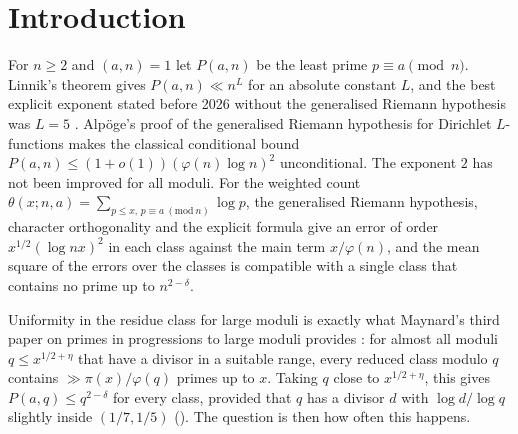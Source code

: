 \documentclass[11pt,colorlinks]{charlie}
\begin{document}
\section{Introduction}
For $n\ge2$ and $(a,n)=1$ let $P(a,n)$ be the least prime $p\equiv a\pmod n$. Linnik's theorem gives $P(a,n)\ll n^L$ for an absolute constant $L$, and the best explicit exponent stated before 2026 without the generalised Riemann hypothesis was $L=5$ \cite[Thm.~2.1]{Xylouris}. Alp\"oge's proof of the generalised Riemann hypothesis for Dirichlet $L$-functions \cite{Alpoge} makes the classical conditional bound $P(a,n)\le(1+o(1))(\varphi(n)\log n)^2$ \cite{BS} unconditional. The exponent $2$ has not been improved for all moduli. For the weighted count $\theta(x;n,a)=\sum_{p\le x,\,p\equiv a\ (\mathrm{mod}\ n)}\log p$, the generalised Riemann hypothesis, character orthogonality and the explicit formula give an error of order $x^{1/2}(\log nx)^2$ in each class against the main term $x/\varphi(n)$, and the mean square of the errors over the classes is compatible with a single class that contains no prime up to $n^{2-\delta}$.

Uniformity in the residue class for large moduli is exactly what Maynard's third paper on primes in progressions to large moduli provides \cite{MaynardIII}: for almost all moduli $q\le x^{1/2+\eta}$ that have a divisor in a suitable range, every reduced class modulo $q$ contains $\gg\pi(x)/\varphi(q)$ primes up to $x$. Taking $q$ close to $x^{1/2+\eta}$, this gives $P(a,q)\le q^{2-\delta}$ for every class, provided that $q$ has a divisor $d$ with $\log d/\log q$ slightly inside $(1/7,1/5)$ (). The question is then how often this happens.
\end{document}
